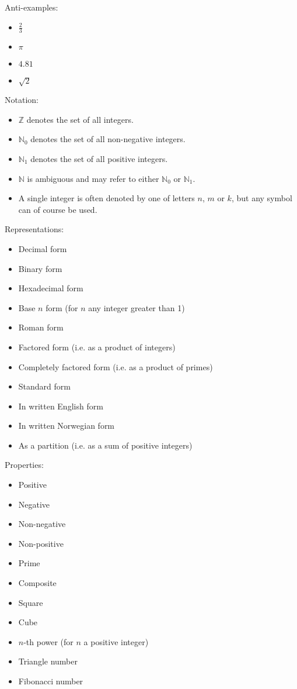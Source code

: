 \documentclass[12pt]{amsart}
\begin{document}
Anti-examples:
\smallskip
\begin{itemize}
  \item $\frac{2}{3}$
  \item $\pi$
  \item $4.81$
  \item $\sqrt{2}$
\end{itemize}
\bigskip

Notation:
\smallskip
\begin{itemize}
  \item $\mathbb{Z}$ denotes the set of all integers.
  \item $\mathbb{N}_0$ denotes the set of all non-negative integers.
  \item $\mathbb{N}_1$ denotes the set of all positive integers.
  \item $\mathbb{N}$ is ambiguous and may refer to either $\mathbb{N}_0$ or $\mathbb{N}_1$.
  \item A single integer is often denoted by one of letters $n$, $m$ or $k$, but any symbol can of course be used.
\end{itemize}
\bigskip

Representations:
\smallskip
\begin{itemize}
  \item Decimal form
  \item Binary form
  \item Hexadecimal form
  \item Base $n$ form (for $n$ any integer greater than 1)
  \item Roman form
  \item Factored form (i.e. as a product of integers)
  \item Completely factored form (i.e. as a product of primes)
  \item Standard form
  \item In written English form
  \item In written Norwegian form
  \item As a partition (i.e. as a sum of positive integers)
\end{itemize}
\bigskip

Properties:
\smallskip
\begin{itemize}
  \item Positive
  \item Negative
  \item Non-negative
  \item Non-positive
  \item Prime
  \item Composite
  \item Square
  \item Cube
  \item $n$-th power (for $n$ a positive integer)
  \item Triangle number
  \item Fibonacci number
\end{itemize}
\bigskip
\end{document}
